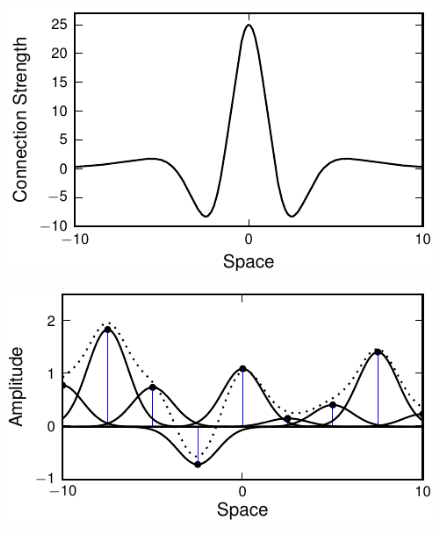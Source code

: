 \documentclass[5p,authoryear]{elsarticle}
\begin{document}
\clearpage
\newpage
\begin{figure}[!ht]
\begin{center}
\includegraphics{./Graph/pdf/fig1.pdf} 
\end{center}
\caption{}
\label{fig:Figure1}
\end{figure}
\clearpage
\newpage
\begin{figure}[!ht]
\begin{center}
\includegraphics{./Graph/pdf/fig2.pdf} 
\end{center}
\caption{}
\label{fig:Figure2}
\end{figure}
\clearpage
\newpage
\end{document}
